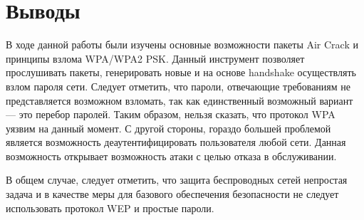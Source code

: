 \documentclass[utf8x, 12pt]{G7-32}
\begin{document}
\chapter{Выводы}

В ходе данной работы были изучены основные возможности пакеты Air Crack и принципы взлома WPA/WPA2 PSK. Данный инструмент позволяет прослушивать пакеты, генерировать новые и на основе handshake осуществлять взлом пароля сети. Следует отметить, что пароли, отвечающие требованиям не представляется возможном взломать, так как единственный возможный вариант --- это перебор паролей. Таким образом, нельзя сказать, что протокол WPA уязвим на данный момент. С другой стороны, гораздо большей проблемой является возможность деаутентифицировать пользователя любой сети. Данная возможность открывает возможность атаки с целью отказа в обслуживании.

В общем случае, следует отметить, что защита беспроводных сетей непростая задача и в качестве меры для базового обеспечения безопасности не следует использовать протокол WEP и простые пароли.
\end{document}
